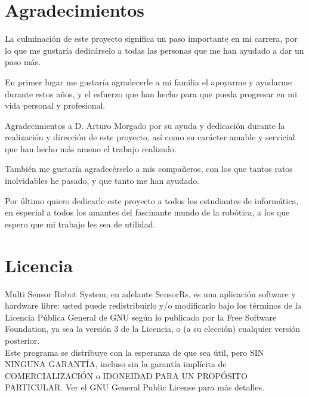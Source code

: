 

\section{Agradecimientos}
\label{sec:agradecimientos}

La culminación de este proyecto significa un paso importante en mi carrera, por lo que me gustaría dedicárselo a todas las personas que me han ayudado a dar un paso más.\bigskip

En primer lugar me gustaría agradecerle a mi familia el apoyarme y ayudarme durante estos años,
y el esfuerzo que han hecho para que pueda progresar en mi vida personal y profesional.\bigskip

Agradecimientos a D. Arturo Morgado por su ayuda y dedicación durante la realización y dirección de este proyecto, así como su carácter amable y servicial que han hecho más ameno el trabajo realizado.\bigskip

También me gustaría agradecérselo a mis compañeros, con los que tantos ratos inolvidables he pasado, y que tanto me han ayudado.\bigskip

Por último quiero dedicarle este proyecto a todos los estudiantes de informática, en especial a todos los amantes del fascinante mundo de la robótica, a los que espero que mi trabajo les sea de utilidad.

\cleardoublepage

\section{Licencia}
\label{sec:licencia}

\bigskip
\bigskip

Multi Sensor Robot System, en adelante SensorRs, es una aplicación software y hardware libre: usted puede redistribuirlo y/o modificarlo bajo los términos de la Licencia Pública General de GNU según lo publicado por la Free Software Foundation, ya sea la versión 3 
de la Licencia, o (a su elección) cualquier versión posterior.\\

Este programa se distribuye con la esperanza de que sea útil, pero SIN NINGUNA GARANTÍA, incluso sin la garantía implícita de COMERCIALIZACIÓN o IDONEIDAD PARA UN PROPÓSITO PARTICULAR. Ver el GNU
General Public License para más detalles.\\


